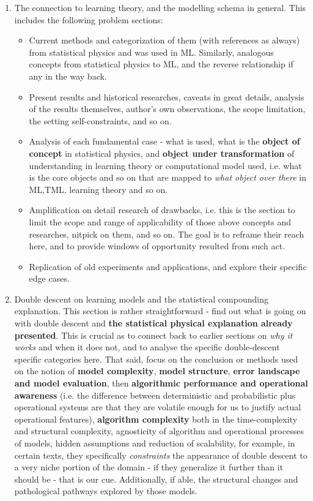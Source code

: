 \begin{enumerate}[topsep=1pt,itemsep=1pt]
\begin{itemize}[topsep=1pt,itemsep=1pt]
    \end{itemize}
    \item The connection to learning theory, and the modelling schema in general. This includes the following problem sections:
    \begin{itemize}
        \item Current methods and categorization of them (with references as always) from statistical physics and was used in ML. Similarly, analogous concepts from statistical physics to ML, and the reverse relationship if any in the way back. 
        \item Present results and historical researches, caveats in great details, analysis of the results themselves, author's own observations, the scope limitation, the setting self-constraints, and so on. 
        \item Analysis of each fundamental case - what is used, what is the \textbf{object of concept} in statistical physics, and \textbf{object under transformation} of understanding in learning theory or computational model used, i.e. what is the core objects and so on that are mapped to \textit{what object over there} in ML,TML, learning theory and so on. 
        \item Amplification on detail research of drawbacks, i.e. this is the section to limit the scope and range of applicability of those above concepts and researches, nitpick on them, and so on. The goal is to reframe their reach here, and to provide windows of opportunity resulted from such act. 
        \item Replication of old experiments and applications, and explore their specific edge cases. 
    \end{itemize}
    \item Double descent on learning models and the statistical compounding explanation. This section is rather straightforward - find out what is going on with double descent and \textbf{the statistical physical explanation already presented}. This is crucial as to connect back to earlier sections on \textit{why it works} and when it does not, and to analyse the specific double-descent specific categories here. That said, focus on the conclusion or methods used on the notion of \textbf{model complexity}, \textbf{model structure}, \textbf{error landscape and model evaluation}, then \textbf{algorithmic performance and operational awareness} (i.e. the difference between deterministic and probabilistic plus operational systems are that they are volatile enough for us to justify actual operational features), \textbf{algorithm complexity} both in the time-complexity and structural complexity, agnosticity of algorithm and operational processes of models, hidden assumptions and reduction of scalability, for example, in certain texts, they specifically \textit{constraints} the appearance of double descent to a very niche portion of the domain - if they generalize it further than it should be - that is our cue. Additionally, if able, the structural changes and pathological pathways explored by those models. 

\end{enumerate}
